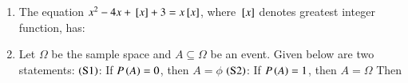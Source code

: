 \documentclass[journal,12pt,onecolumn]{IEEEtran}
\theoremstyle{remark}
\begin{document}
\begin{enumerate}
\item The equation $x^2-4x+{}\left[x\right]+3=x{}\left[x\right]$, where ${}\left[x\right]$ denotes greatest integer function, has:
\hfill{}
\begin{enumerate}
\end{enumerate}

\item Let $\Omega$ be the sample space and $A\subseteq \Omega$ be an event. Given below are two statements:\newline
$\left(\text{S} 1\right)$: If $P\left(A\right)=0$, then $A=\phi$\newline
$\left(\text{S} 2\right)$: If $P\left(A\right)=1$, then $A=\Omega$\newline
Then

\hfill{}
\begin{enumerate}
\end{enumerate}
\end{enumerate}
\end{document}
